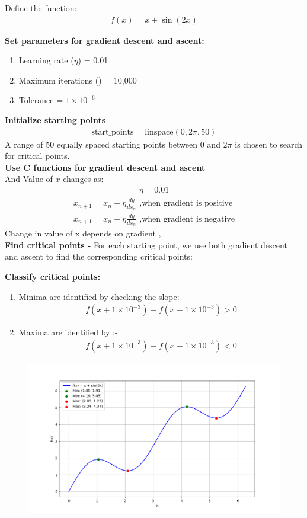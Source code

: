 \documentclass[journal]{IEEEtran}
\numberwithin{equation}{enumi}
\numberwithin{figure}{enumi}
\begin{document}
\begin{enumerate}
Define the function:
    \begin{align}
    f(x) = x + \sin(2x)
    \end{align}

    \textbf{Set parameters for gradient descent and ascent:}
    \begin{enumerate}
        \item Learning rate ($ \eta $) = 0.01
        \item Maximum iterations () = 10,000
        \item Tolerance  = $1 \times 10^{-6}$
    \end{enumerate}
    
    \textbf{Initialize starting points}
    \begin{align}
    \text{start\_points} = \text{linspace}(0, 2\pi, 50)
    \end{align}
    A range of 50 equally spaced starting points between $0$ and $2\pi$ is chosen to search for critical points.\\
    
    \textbf{Use C functions for gradient descent and ascent}\\
     And Value of $x$ changes as:-
     \begin{align}
     \eta = 0.01
     \end{align}
     \begin{align}
     x_{n+1} = x_{n} + \eta\frac{dy}{dx_n} \text{ ,when gradient is positive}\\
     x_{n+1} = x_{n} - \eta\frac{dy}{dx_n} \text{ ,when gradient is negative}
     \end{align}
     Change in value of x depends on gradient ,\\
     \textbf{Find critical points - }
     For each starting point, we use both gradient descent and ascent to find the corresponding critical points:

     \textbf{Classify critical points:}
     \begin{enumerate}
        \item Minima are identified by checking the slope:
        \begin{align}
        f(x + 1 \times 10^{-3}) - f(x - 1 \times 10^{-3}) > 0
        \end{align}
        \item Maxima are identified by :-
        \begin{align}
        f(x + 1 \times 10^{-3}) - f(x - 1 \times 10^{-3}) < 0
        \end{align}
    \end{enumerate}
    
\end{enumerate}
\begin{figure}[h!]
   \centering
   \includegraphics[width=0.7\linewidth]{figs/Figure_1.png}
\end{figure}
\end{document}
